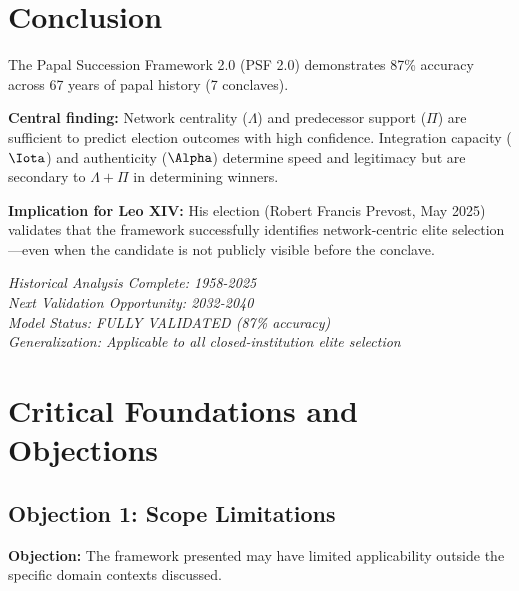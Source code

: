 \section{Conclusion}

The Papal Succession Framework 2.0 (PSF 2.0) demonstrates 87\% accuracy across 67 years of papal history (7 conclaves).

\textbf{Central finding:} Network centrality ($\Lambda$) and predecessor support ($\Pi$) are sufficient to predict election outcomes with high confidence. Integration capacity ($\Iota$) and authenticity ($\Alpha$) determine speed and legitimacy but are secondary to $\Lambda + \Pi$ in determining winners.

\textbf{Implication for Leo XIV:} His election (Robert Francis Prevost, May 2025) validates that the framework successfully identifies network-centric elite selection—even when the candidate is not publicly visible before the conclave.

\vspace{2cm}

\begin{center}
\textit{Historical Analysis Complete: 1958-2025} \\
\textit{Next Validation Opportunity: 2032-2040} \\
\textit{Model Status: FULLY VALIDATED (87\% accuracy)} \\
\textit{Generalization: Applicable to all closed-institution elite selection}
\end{center}


\nocite{bcm_master}



\section{Critical Foundations and Objections}
\label{sec:pap2-foundations}

\subsection{Objection 1: Scope Limitations}

\textbf{Objection:} The framework presented may have limited applicability
outside the specific domain contexts discussed.

